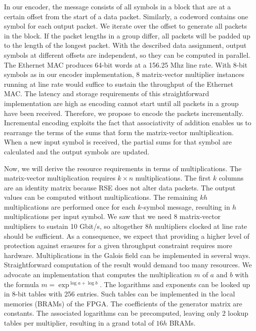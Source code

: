 In our encoder, the message consists of all symbols in a block that are at a
certain offset from the start of a data packet.  Similarly, a codeword contains
one symbol for each output packet.  We iterate over the offset to generate
all packets in the block.  If the packet lengths in a group differ, all packets
will be padded up to the length of the longest packet.
With the described data assignment, output symbols at
different offsets are independent, so they can be computed in parallel.  The
Ethernet MAC produces 64-bit words at a 156.25 Mhz line rate.  With 8-bit symbols as in our
encoder implementation, 8 matrix-vector multiplier instances running at
line rate would suffice to sustain the throughput of the Ethernet MAC.  The
latency and storage requirements of this straightforward implementation are
high as encoding cannot start until all packets in a group have been received.
Therefore, we propose to encode the packets incrementally.  Incremental
encoding exploits the fact that associativity of addition enables us to
rearrange the terms of the sums that form the matrix-vector multiplication.
When a new input symbol is received, the partial sums for that symbol are
calculated and the output symbols are updated.

Now, we will derive the resource requirements in terms of multiplications.
The matrix-vector multiplication requires $k \times n$ multiplications.  The
first $k$ columns are an identity matrix because RSE does not alter data
packets.  The output values can be computed without multiplications.  The
remaining $kh$ multiplications are performed once for each $k$-symbol message,
resulting in $h$ multiplications per input symbol.  We saw that we need 8
matrix-vector multipliers to sustain 10 Gbit/s, so altogether $8h$ multipliers
clocked at line rate should be sufficient.  As a consequence, we expect that
providing a higher level of protection against erasures for a given throughput
constraint requires more hardware.  Multiplications in the Galois field can be
implemented in several ways.  Straightforward computation of the result would
demand too many resources.  We advocate an implementation that computes the
multiplication $m$ of $a$ and $b$ with the formula $m = \exp^{\log a + \log b}$.
The logarithms and exponents can be looked up in 8-bit tables with 256 entries.
Such tables can be implemented in the local memories (BRAMs) of the FPGA.  
The coefficients of the generator matrix are constants.  The associated
logarithms can be precomputed, leaving only 2 lookup tables per multiplier,
resulting in a grand total of $16h$ BRAMs.


